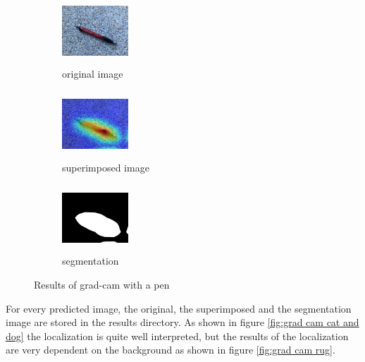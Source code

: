 \documentclass[../ImageClassifier.tex]{subfiles}
\begin{document}
    \begin{figure}[H]
        \begin{subfigure}{.32\textwidth}
          \centering
          \includegraphics[height=2.5cm, width=2.5cm]{./attachments/results/5-pen.jpg}
          \caption{original image}
          \label{fig:original image}
        \end{subfigure}
        \begin{subfigure}{.32\textwidth}
          \centering
          \includegraphics[height=2.5cm, width=2.5cm]{./attachments/results/5-pen-grad.jpg}
          \caption{superimposed image}
          \label{fig:heatmap activasion}
        \end{subfigure}
        \begin{subfigure}{.32\textwidth}
            \centering
            \includegraphics[height=2.5cm, width=2.5cm]{./attachments/results/5-pen-seg.jpg}
            \caption{segmentation}
            \label{fig:heatmap resized}
        \end{subfigure}
        \caption{Results of \ac{grad-cam} with a pen}
        \label{fig:grad cam pen}
    \end{figure}
    \clearpage
    For every predicted image, the original, the superimposed and the segmentation image are stored in the results directory.
    As shown in figure \ref{fig:grad cam cat and dog} the localization is quite well interpreted, but the results of the localization are very dependent on the background as shown in figure \ref{fig:grad cam rug}.
\end{document}
